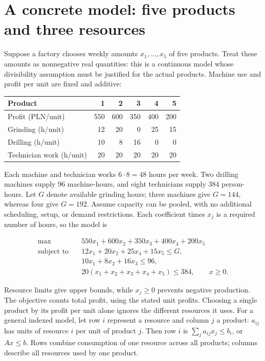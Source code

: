 \documentclass[11pt,a4paper]{article}
\begin{document}
\section{A concrete model: five products and three resources}\label{sec:factory}
Suppose a factory chooses weekly amounts $x_1,\ldots,x_5$ of five products.
Treat these amounts as nonnegative real quantities: this is a continuous model
whose divisibility assumption must be justified for the actual products.
Machine use and profit per unit are fixed and additive:
\begin{center}
  \begin{tabular}{lrrrrr}\toprule
    Product & 1 & 2 & 3 & 4 & 5\\\midrule
    Profit (PLN/unit) & 550 & 600 & 350 & 400 & 200\\
    Grinding (h/unit) & 12 & 20 & 0 & 25 & 15\\
    Drilling (h/unit) & 10 & 8 & 16 & 0 & 0\\
    Technician work (h/unit) & 20 & 20 & 20 & 20 & 20\\\bottomrule
  \end{tabular}
\end{center}
Each machine and technician works $6\cdot8=48$ hours per week. Two drilling
machines supply $96$ machine-hours, and eight technicians supply $384$
person-hours. Let $G$ denote available grinding hours; three machines give
$G=144$, whereas four give $G=192$. Assume capacity can be pooled, with no
additional scheduling, setup, or demand restrictions. Each coefficient times
$x_j$ is a required number of hours, so the model is
\begin{lecturecore}
  \begin{equation}\label{eq:factory}
    \begin{aligned}
      \max\quad &550x_1+600x_2+350x_3+400x_4+200x_5\\
      \text{subject to}\quad
      &12x_1+20x_2+25x_4+15x_5\leq G,\\
      &10x_1+8x_2+16x_3\leq96,\\
      &20(x_1+x_2+x_3+x_4+x_5)\leq384,\qquad x\geq0.
    \end{aligned}
  \end{equation}
\end{lecturecore}
Resource limits give upper bounds, while $x_j\geq0$ prevents negative production.
The objective counts total profit, using the stated unit profits. Choosing a
single product by its profit per unit alone ignores the different resources it uses.
For a general indexed model, let row $i$ represent a resource and column $j$
a product: $a_{ij}$ has units of resource $i$ per unit of product $j$.
Then row $i$ is $\sum_j a_{ij}x_j\leq b_i$, or $Ax\leq b$.
Rows combine consumption of one resource across all products; columns describe
all resources used by one product.
\end{document}
